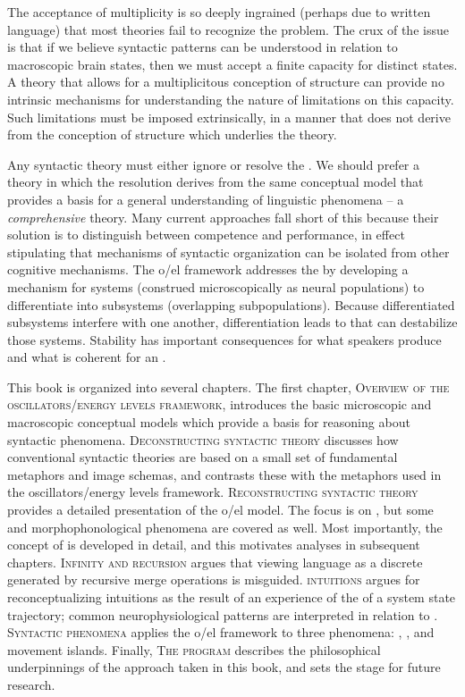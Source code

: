   The acceptance of multiplicity is so deeply ingrained (perhaps due to written language) that most theories fail to recognize the problem. The crux of the issue is that if we believe syntactic patterns can be understood in relation to macroscopic brain states, then we must accept a finite capacity for distinct states. A theory that allows for a multiplicitous conception of structure can provide no intrinsic mechanisms for understanding the nature of limitations on this capacity. Such limitations must be imposed extrinsically, in a manner that does not derive from the conception of structure which underlies the theory.

  Any syntactic theory must either ignore or resolve the . We should prefer a theory in which the resolution derives from the same conceptual model that provides a basis for a general understanding of linguistic phenomena -- a \textit{comprehensive} theory. Many current approaches fall short of this because their solution is to distinguish between competence and performance, in effect stipulating that mechanisms of syntactic organization can be isolated from other cognitive mechanisms. The o/el framework addresses the  by developing a mechanism for systems (construed microscopically as neural populations) to differentiate into subsystems (overlapping subpopulations). Because differentiated subsystems interfere with one another, differentiation leads to  that can destabilize those systems. Stability has important consequences for what speakers produce and what is coherent for an .

  This book is organized into several chapters. The first chapter, \textsc{Overview of the oscillators/energy levels framework}, introduces the basic microscopic and macroscopic conceptual models which provide a basis for reasoning about syntactic phenomena. \textsc{Deconstructing syntactic theory} discusses how conventional syntactic theories are based on a small set of fundamental metaphors and image schemas, and contrasts these with the metaphors used in the oscillators/energy levels framework. \textsc{Reconstructing syntactic theory} provides a detailed presentation of the o/el model. The focus is on , but some  and morphophonological phenomena are covered as well. Most importantly, the concept of  is developed in detail, and this motivates analyses in subsequent chapters. \textsc{Infinity and recursion} argues that viewing language as a discrete  generated by recursive merge operations is misguided. \textsc{ intuitions} argues for reconceptualizing  intuitions as the result of an experience of the  of a system state trajectory; common neurophysiological patterns are interpreted in relation to . \textsc{Syntactic phenomena} applies the o/el framework to three phenomena: , , and movement islands. Finally, \textsc{The  program} describes the philosophical underpinnings of the approach taken in this book, and sets the stage for future research.

